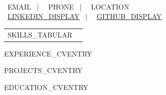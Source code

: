 \documentclass[]{awesome-cv}
\begin{document}
\begin{center}
	  \\
	\vspace{2mm}
	{\hspace{0.8cm}\faEnvelope\ {{EMAIL}}} ~|~ {\faMobile\ {{PHONE}}} ~|~ {\faMapMarker\ {{LOCATION}}} \\
	\small
	{\faLink\ \href{{{LINKEDIN_URL}}}{\underline{{{LINKEDIN_DISPLAY}}}}} ~|~ {\faGithub\ \href{{{GITHUB_URL}}}{\underline{{{GITHUB_DISPLAY}}}}}
\end{center}

\begin{cventries}
	\cventry
	{}
	{\def\arraystretch{1.15}{\begin{tabular}{ l l }
		{{SKILLS_TABULAR}}
		\end{tabular}}}
	{}
	{}
	{}
\end{cventries}
\vspace{-7mm}

\begin{cventries}
{{EXPERIENCE_CVENTRY}}
\end{cventries}

\begin{cventries}
{{PROJECTS_CVENTRY}}
\end{cventries}

\begin{cventries}
{{EDUCATION_CVENTRY}}
\end{cventries}
\end{document}
